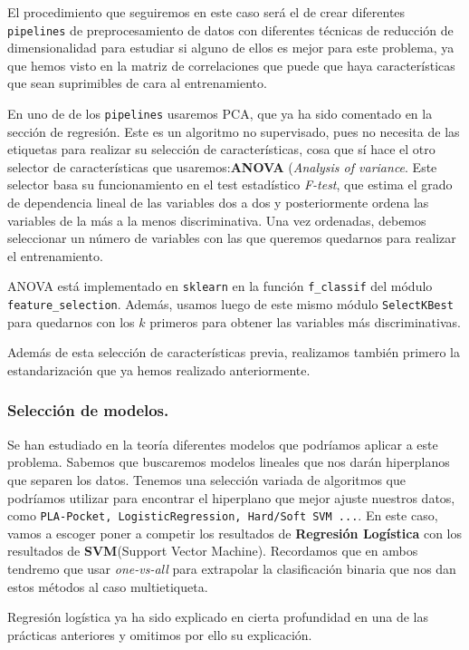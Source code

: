 \documentclass[a4paper, 20pt]{article}
\begin{document}
El procedimiento que seguiremos en este caso será el de crear diferentes \lstinline{pipelines} de preprocesamiento de datos con diferentes técnicas de reducción de dimensionalidad para estudiar si alguno de ellos es mejor para este problema, ya que hemos visto en la matriz de correlaciones que puede que haya características que sean suprimibles de cara al entrenamiento.

En uno de de los \lstinline{pipelines} usaremos PCA, que ya ha sido comentado en la sección de regresión. Este es un algoritmo no supervisado, pues no necesita de las etiquetas para realizar su selección de características, cosa que sí hace el otro selector de características que usaremos:\textbf{ANOVA} (\emph{Analysis of variance}. Este selector basa su funcionamiento en el test estadístico \emph{F-test}, que estima el grado de dependencia lineal de las variables dos a dos y posteriormente ordena las variables de la más a la menos discriminativa. Una vez ordenadas, debemos seleccionar un número de variables con las que queremos quedarnos para realizar el entrenamiento.

ANOVA está implementado en \lstinline{sklearn} en la función \lstinline{f_classif} del módulo \lstinline{feature_selection}. Además, usamos luego de este mismo módulo  \lstinline{SelectKBest} para quedarnos con los $k$ primeros para obtener las variables más discriminativas.

Además de esta selección de características previa, realizamos también primero la estandarización que ya hemos realizado anteriormente.

\subsubsection{Selección de modelos.}

Se han estudiado en la teoría diferentes modelos que podríamos aplicar a este problema. Sabemos que buscaremos modelos lineales que nos darán hiperplanos que separen los datos. Tenemos una selección variada de algoritmos que podríamos utilizar para encontrar el hiperplano que mejor ajuste nuestros datos, como \lstinline{PLA-Pocket, LogisticRegression, Hard/Soft SVM ...}. En este caso, vamos a escoger poner a competir los resultados de \textbf{Regresión Logística} con los resultados de \textbf{SVM}(Support Vector Machine). Recordamos que en ambos tendremo que usar \emph{one-vs-all} para extrapolar la clasificación binaria que nos dan estos métodos al caso multietiqueta.

Regresión logística ya ha sido explicado en cierta profundidad en una de las prácticas anteriores \cite{saez_fjsaezmml_2021} y omitimos por ello su explicación.
\end{document}
